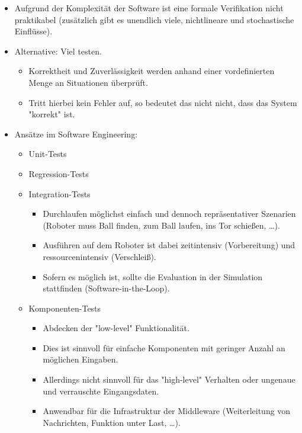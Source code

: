 		\begin{itemize}
			\item Aufgrund der Komplexität der Software ist eine formale Verifikation nicht praktikabel (zusätzlich gibt es unendlich viele, nichtlineare und stochastische Einflüsse).
			\item Alternative: Viel testen.
				\begin{itemize}
					\item Korrektheit und Zuverlässigkeit werden anhand einer vordefinierten Menge an Situationen überprüft.
					\item Tritt hierbei kein Fehler auf, so bedeutet das nicht nicht, dass das System "korrekt" ist.
				\end{itemize}
			\item Ansätze im Software Engineering:
				\begin{itemize}
					\item Unit-Tests
					\item Regression-Tests
					\item Integration-Tests
						\begin{itemize}
							\item Durchlaufen möglichst einfach und dennoch repräsentativer Szenarien (Roboter muss Ball finden, zum Ball laufen, ins Tor schießen, \dots).
							\item Ausführen auf dem Roboter ist dabei zeitintensiv (Vorbereitung) und ressourcenintensiv (Verschleiß).
							\item Sofern es möglich ist, sollte die Evaluation in der Simulation stattfinden (Software-in-the-Loop).
						\end{itemize}
					\item Komponenten-Tests
						\begin{itemize}
							\item Abdecken der "low-level" Funktionalität.
							\item Dies ist sinnvoll für einfache Komponenten mit geringer Anzahl an möglichen Eingaben.
							\item Allerdings nicht sinnvoll für das "high-level" Verhalten oder ungenaue und verrauschte Eingangsdaten.
							\item Anwendbar \zB für die Infrastruktur der Middleware (Weiterleitung von Nachrichten, Funktion unter Last, \dots).
						\end{itemize}
				\end{itemize}
		\end{itemize}

